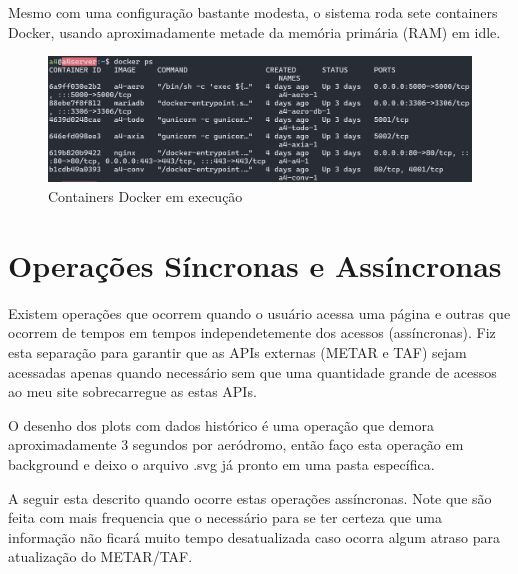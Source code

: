 Mesmo com uma configuração bastante modesta, o sistema roda sete containers Docker, usando 
aproximadamente metade da memória primária (RAM) em idle.

\begin{figure}[ht]
    \begin{center}
    \includegraphics[width=400pt]{img/containers.png}
    \caption{Containers Docker em execução}
    \label{fig:containers}
    \end{center}
\end{figure}

\section{Operações Síncronas e Assíncronas}

Existem operações que ocorrem quando o usuário acessa uma página e outras que
ocorrem de tempos em tempos independetemente dos acessos (assíncronas). Fiz
esta separação para garantir que as APIs externas (METAR e TAF) sejam acessadas 
apenas quando
necessário sem que uma quantidade grande de acessos ao meu site sobrecarregue as estas APIs.

O desenho dos plots com dados histórico é uma operação que demora aproximadamente
3 segundos por aeródromo, então faço esta operação em background e deixo o 
arquivo .svg já pronto em uma pasta específica.

A seguir esta descrito quando ocorre estas operações assíncronas. Note que são
feita com mais frequencia que o necessário para se ter certeza que uma informação não
ficará muito tempo desatualizada caso ocorra algum atraso para atualização do METAR/TAF.

